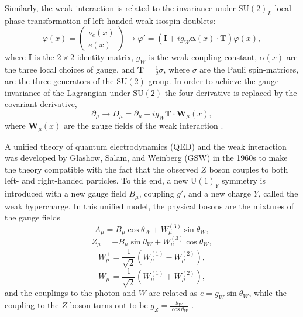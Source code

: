 Similarly, the weak interaction is related to the invariance under $\text{SU}(2)_L$ local
phase transformation of left-handed weak isospin doublets:
\begin{equation}
\varphi(x) = \begin{pmatrix} \nu_e(x) \\ e(x) \end{pmatrix} \rightarrow
\varphi' = (\mathbf{I} + i g_W \mathbf{\alpha}(x)\cdot\mathbf{T}) \varphi(x),
\end{equation}
where $\mathbf{I}$ is the $2\times2$ identity matrix, $g_W$ is the weak coupling constant,
$\alpha(x)$ are the three local choices of gauge, and $\mathbf{T} = \frac{1}{2}\sigma$,
where $\sigma$ are the Pauli spin-matrices, are the three generators of the $\text{SU}(2)$ group.
In order to achieve the gauge invariance of the Lagrangian under $\text{SU}(2)$ the four-derivative
is replaced by the covariant derivative,
\begin{equation}
\partial_\mu \rightarrow D_\mu = \partial_\mu + i g_W \mathbf{T} \cdot \mathbf{W}_\mu(x),
\end{equation}
where $\mathbf{W}_\mu(x)$ are the gauge fields of the weak interaction \cite{Thomson:2013zua}.

A unified theory of quantum electrodynamics (QED) and the weak interaction was developed
by Glashow, Salam, and Weinberg (GSW) in the 1960s \cite{Thomson:2013zua} to make the
theory compatible with the fact that the observed $Z$ boson couples to both left- and
right-handed particles. To this end, a new $\text{U}(1)_Y$ symmetry is introduced with a new gauge
field $B_\mu$, coupling $g'$, and a new charge $Y$, called the weak hypercharge. In this unified model,
the physical bosons are the mixtures of the gauge fields
\begin{equation}
A_\mu = B_\mu \cos\theta_W + W_\mu^{(3)} \sin{\theta_W},
\end{equation}
\begin{equation}
Z_\mu = - B_\mu \sin{\theta_W} + W_\mu^{(3)} \cos{\theta_W},
\end{equation}
\begin{equation}
W^+_\mu = \frac{1}{\sqrt{2}}\left( W_\mu^{(1)} - W_\mu^{(2)} \right),
\end{equation}
\begin{equation}
W^-_\mu = \frac{1}{\sqrt{2}}\left( W_\mu^{(1)} + W_\mu^{(2)} \right),
\end{equation}
and the couplings to the photon and $W$ are related as $e = g_W \sin{\theta_W}$,
while the coupling to the $Z$ boson turns out to be $g_Z  = \frac{g_W}{\cos{\theta_W}}$ \cite{Thomson:2013zua}.

